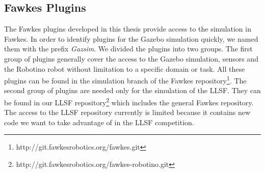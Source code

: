 \subsection{Fawkes Plugins}
The Fawkes plugins developed in this thesis provide access to the simulation in Fawkes. In order to identify plugins for the Gazebo simulation quickly, we named them with the prefix \textit{Gazsim}. We divided the plugins into two groups. The first group of plugins generally cover the access to the Gazebo simulation, sensors and the Robotino robot without limitation to a specific domain or task. All these plugins can be found in the simulation branch of the Fawkes repository\footnote{http://git.fawkesrobotics.org/fawkes.git}. The second group of plugins are needed only for the simulation of the LLSF. They can be found in our LLSF repository\footnote{http://git.fawkesrobotics.org/fawkes-robotino.git} which includes the general Fawkes repository. The access to the LLSF repository currently is limited because it contains new code we want to take advantage of in the LLSF competition.

